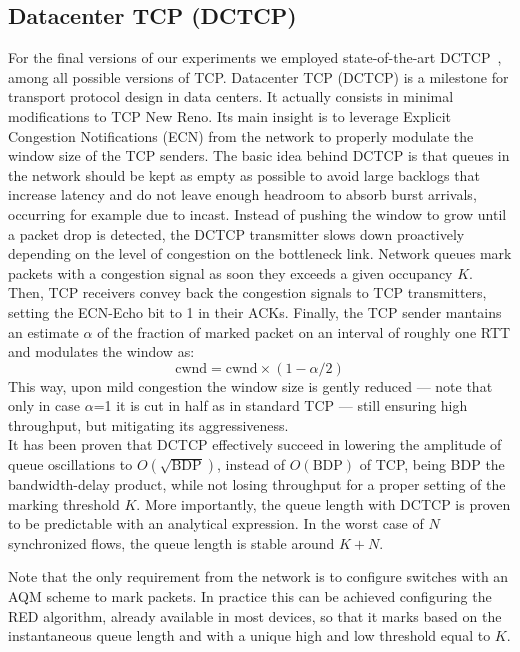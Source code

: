 \subsection{Datacenter TCP (DCTCP)}
\label{sec:dctcp}
For the final versions of our experiments we employed state-of-the-art DCTCP~\cite{dctcp}, among all possible versions of TCP.
Datacenter TCP (DCTCP) is a milestone for transport protocol design in data centers. It actually consists in minimal modifications to TCP New Reno. Its main insight is to leverage Explicit Congestion Notifications (ECN) from the network to properly modulate the window size of the TCP senders. The basic idea behind DCTCP is that queues in the network should be kept as empty as possible to avoid large backlogs that increase latency and do not leave enough headroom to absorb burst arrivals, occurring for example due to incast. Instead of pushing the window to grow until a packet drop is detected, the DCTCP transmitter slows down proactively depending on the level of congestion on the bottleneck link. Network queues mark packets with a congestion signal as soon they exceeds a given occupancy $K$. Then, TCP receivers convey back the congestion signals to TCP transmitters, setting the ECN-Echo bit to 1 in their ACKs. Finally, the TCP sender mantains an estimate $\alpha$ of the fraction of marked packet on an interval of roughly one RTT and modulates the window as:
\[ \text{cwnd} = \text{cwnd} \times (1-\alpha/2)\]
This way, upon mild congestion the window size is gently reduced --- note that only in case $\alpha$=1 it is cut in half as in standard TCP --- still ensuring high throughput, but mitigating its aggressiveness.\\It has been proven that DCTCP effectively succeed in lowering the amplitude of queue oscillations to $O(\sqrt{\text{BDP}})$, instead of $O(\text{BDP})$ of TCP, being BDP the bandwidth-delay product, while not losing throughput for a proper setting of the marking threshold $K$. More importantly, the queue length with DCTCP is proven to be predictable with an analytical expression. In the worst case of $N$ synchronized flows, the queue length is stable around $K+N$.

Note that the only requirement from the network is to configure switches with an AQM scheme to mark packets. In practice this can be achieved configuring the RED algorithm, already available in most devices, so that it marks based on the instantaneous queue length and with a unique high and low threshold equal to $K$. 
